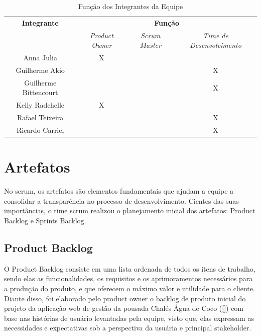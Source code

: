 \documentclass[
	12pt,				%
	openany,			%
	twoside,			%
	a4paper,			%
	english,			%
	french,				%
	spanish,			%
	brazil				%
	]{abntex2}
\begin{document}
\begin{table}[htb]
	\centering
	\caption{Função dos Integrantes da Equipe}
	\label{tab:time_scrum}
	\begin{tabular}{|c|c|c|c|}
		\hline
		\textbf{Integrante} & \multicolumn{3}{c|}{\textbf{Função}} \\ \cline{2-4}
		& \textit{Product Owner} & \textit{Scrum Master} & \textit{Time de Desenvolvimento} \\ \hline
		Anna Julia & X & & \\ \hline
		Guilherme Akio & & & X \\ \hline
		Guilherme Bittencourt & & & X \\ \hline
		Kelly Radchelle & X & & \\ \hline
		Rafael Teixeira & & & X \\ \hline
		Ricardo Carriel & & & X \\ \hline
	\end{tabular}
\end{table}

\section{Artefatos}
No scrum,  os artefatos são elementos fundamentais que ajudam a equipe a consolidar a transparência no processo de desenvolvimento. Cientes das suas importâncias, o time scrum realizou o planejamento inicial dos artefatos: Product Backlog e Sprints Backlog.

\subsection{Product Backlog}
O Product Backlog consiste em uma lista ordenada de todos os itens de trabalho, sendo elas as funcionalidades, os requisitos e os aprimoramentos necessários para a produção do produto,  e que oferecem o máximo valor e utilidade para o cliente. Diante disso, foi elaborado pelo product owner o backlog de produto inicial do projeto da aplicação web de gestão da pousada Chalés Água de Coco (\autoref{}) com base nas histórias de usuário levantadas pela equipe, visto que, elas expressam as necessidades e expectativas sob a perspectiva da usuária e principal stakeholder.
\end{document}
